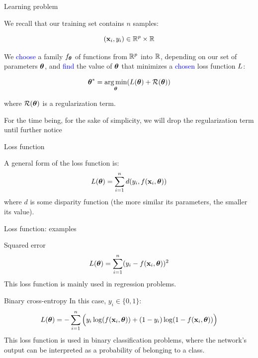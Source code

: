 \documentclass[xcolor=pdftex,dvipsnames,table,mathserif]{beamer}
\begin{document}
\begin{frame}{Learning problem}

  We recall that our training set contains $n$ samples:

  \[
  (\mathbf{x}_i, y_i) \in \mathbb{R}^p \times \mathbb{R}
  \]

  We \textcolor{blue}{choose} a family $f_{\boldsymbol{\theta}}$
  of functions from $\mathbb{R}^p$ into $\mathbb{R}$,
  depending on our set of parameters $\boldsymbol{\theta}$,
  and \textcolor{blue}{find} the value of $\boldsymbol{\theta}$
  that minimizes a \textcolor{blue}{chosen} loss function $L$:

\[
\boldsymbol{\theta} ^{\ast} = \operatorname*{arg\,min}_{\boldsymbol{\theta}} ( L (\boldsymbol{\theta}) + \mathcal{R}(\boldsymbol{\theta}) )
\]

where $\mathcal{R}(\boldsymbol{\theta})$ is a regularization term.

\vspace{1em}

\small{For the time being, for the sake of simplicity, we will drop the regularization term until further notice}

\end{frame}

\begin{frame}{Loss function}

  A general form of the loss function is:
  \[
  L(\boldsymbol{\theta}) = \sum\limits_{i=1}^n d(y_i, f(\mathbf{x}_i, \boldsymbol{\theta}))
  \]
  where $d$ is some disparity function (the more similar its parameters, the smaller its value).

\end{frame}


\begin{frame}{Loss function: examples}


  \begin{block}{Squared error}
    \[
    L(\boldsymbol{\theta}) = \sum\limits_{i=1}^n (y_i - f(\mathbf{x}_i, \boldsymbol{\theta}))^2
    \]
    This loss function is mainly used in regression problems.
  \end{block}

  \begin{block}{Binary cross-entropy}
    In this case, $y_i \in \{0, 1\}$:
    \[
    L(\boldsymbol{\theta}) = -\sum\limits_{i=1}^n \Big(y_i \log( f(\mathbf{x}_i, \boldsymbol{\theta})) + (1 - y_i) \log(1 - f(\mathbf{x}_i, \boldsymbol{\theta}))\Big)
    \]
    This loss function is used in binary classification problems, where the network's output can be interpreted as a probability of belonging to a class.
  \end{block}

\end{frame}
\end{document}
